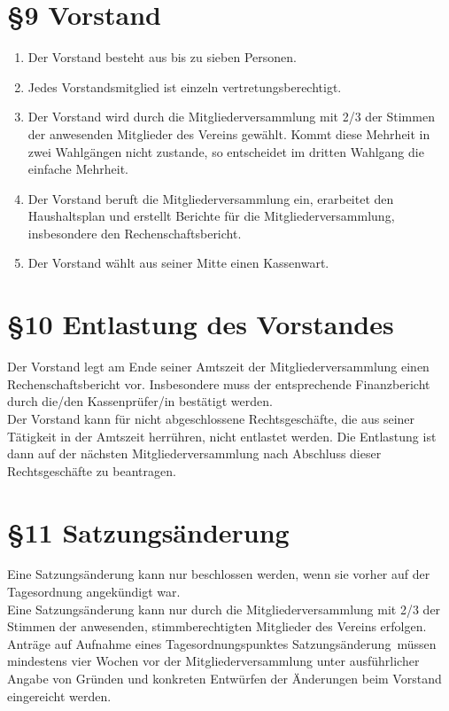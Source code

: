 \documentclass[ngerman]{article}
\begin{document}
\section*{§9 Vorstand}
\begin{enumerate}
 \item Der Vorstand besteht aus bis zu sieben Personen.
 \item Jedes Vorstandsmitglied ist einzeln vertretungsberechtigt.
 \item Der Vorstand wird durch die Mitgliederversammlung mit 2/3 der Stimmen der anwesenden Mitglieder des Vereins gewählt. Kommt diese Mehrheit in zwei Wahlgängen nicht zustande, so entscheidet im dritten Wahlgang die einfache Mehrheit.
 \item Der Vorstand beruft die Mitgliederversammlung ein, erarbeitet den Haushaltsplan und erstellt Berichte für die Mitgliederversammlung, insbesondere den Rechenschaftsbericht.
 \item Der Vorstand wählt aus seiner Mitte einen Kassenwart.
\end{enumerate}


\section*{§10 Entlastung des Vorstandes}
Der Vorstand legt am Ende seiner Amtszeit der Mitgliederversammlung einen Rechenschaftsbericht vor. Insbesondere muss der entsprechende Finanzbericht durch die/den Kassenprüfer/in bestätigt werden.\\
Der Vorstand kann für nicht abgeschlossene Rechtsgeschäfte, die aus seiner Tätigkeit in der Amtszeit herrühren, nicht entlastet werden. Die Entlastung ist dann auf der nächsten Mitgliederversammlung nach Abschluss dieser Rechtsgeschäfte zu beantragen.


\section*{§11 Satzungsänderung}
Eine Satzungsänderung kann nur beschlossen werden, wenn sie vorher auf der Tagesordnung angekündigt war.\\
Eine Satzungsänderung kann nur durch die Mitgliederversammlung mit 2/3 der Stimmen der anwesenden, stimmberechtigten Mitglieder des Vereins erfolgen.\\
Anträge auf Aufnahme eines Tagesordnungspunktes \glqq Satzungsänderung\grqq\ müssen mindestens vier Wochen vor der Mitgliederversammlung unter ausführlicher Angabe von Gründen und konkreten Entwürfen der Änderungen beim Vorstand eingereicht werden.
\end{document}
